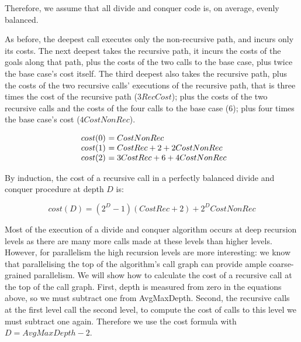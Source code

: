 \noindent
Therefore, we assume that all divide and conquer code is, on average,
evenly balanced.

As before, the deepest call executes only the non-recursive path,
and incurs only its costs.
The next deepest takes the recursive path,
it incurs the costs of the goals along that path,
plus the costs of the two calls to the base case,
plus twice the base case's cost itself.
The third deepest also takes the recursive path,
plus the costs of the two recursive calls' executions of the recursive path,
that is three times the cost of the recursive path ($3{RecCost}$);
plus the costs of the two recursive calls and the costs of the four calls to
the base case ($6$);
plus four times the base case's cost ($4{CostNonRec}$).

\[
\begin{array}{r @{}l @{}l}
cost(0)~&= CostNonRec \\
cost(1)~&= CostRec + 2 + 2{CostNonRec} \\
cost(2)~&= 3{CostRec} + 6 + 4{CostNonRec} \\
\end{array}
\]

\noindent
By induction,
the cost of a recursive call in a perfectly balanced divide and conquer
procedure at depth $D$ is:

\begin{equation*}
cost(D) = (2^D-1)(CostRec + 2) + 2^D{CostNonRec}
\end{equation*}

Most of the execution of a divide and conquer algorithm occurs at deep
recursion levels as there are many more calls made at these levels than higher
levels.
However, for parallelism the high recursion levels are more interesting:
we know that parallelising the top of the algorithm's call graph can provide
ample coarse-grained parallelism.
We will show how to calculate the cost of a recursive call at the top of the
call graph.
First, depth is measured from zero in the equations above, so we must
subtract one from AvgMaxDepth.
Second, the recursive calls at the first level call the second level,
to compute the cost of calls to this level we must subtract one again.
Therefore we use the cost formula with $D = AvgMaxDepth - 2$.


